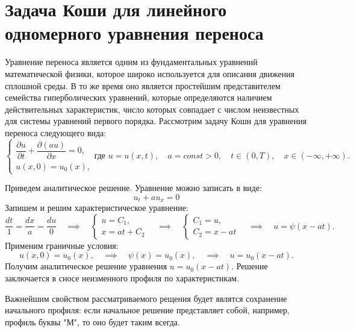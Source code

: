 \documentclass[12pt, a4paper]{article}
\begin{document}
\section{Задача Коши для линейного одномерного уравнения переноса}
Уравнение переноса является одним из фундаментальных уравнений математической физики, которое широко используется для описания движения сплошной среды. В то же время оно является простейшим представителем семейства гиперболических уравнений, которые определяются наличием действительных характеристик, число которых совпадает с числом неизвестных для системы уравнений первого порядка. Рассмотрим задачу Коши для уравнения переноса следующего вида:
\begin{equation}
	\begin{cases}
		\dfrac{\partial u}{\partial t} + \dfrac{\partial (a u)}{\partial x} = 0, \\
		u(x, 0) = u_0(x),
	\end{cases} 
	\text{где } u = u(x, t), \quad a = const > 0, \quad t \in (0, T), \quad x \in (-\infty, +\infty) .
\end{equation}


Приведем аналитическое решение. Уравнение можно записать в виде:
\begin{equation*}
	u_t + a u_x = 0
\end{equation*}
Запишем и решим характеристическое уравнение:
\begin{equation*}
	\dfrac{dt}{1} = \dfrac{dx}{a} = \dfrac{du}{0} \quad \implies  \quad 
	\begin{cases}
		u = C_1,\\
		x = a t + C_2
	\end{cases} 
	\quad \implies \quad
	\begin{cases}
		C_1 = u,\\
		C_2 = x - at
	\end{cases}
	 \quad \implies \quad
	 u = \psi(x-a t).
\end{equation*}
Применим граничные условия:
\begin{equation*}
	u(x, 0) = u_0(x),
	\quad \implies \quad
	\psi(x) = u_0(x),
	 \quad \implies \quad
	 u = u_0(x-a t).
\end{equation*}
Получим аналитическое решение уравнения $u = u_0(x-at)$. Решение заключается в сносе неизменного профиля по характеристикам. 

Важнейшим свойством рассматриваемого рещения будет являтся сохранение начального профиля: если начальное решение представляет собой, например, профиль буквы "М", то оно будет таким всегда.
\end{document}
